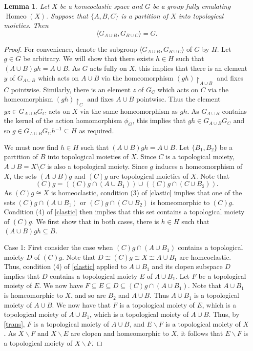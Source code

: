 \documentclass[11pt]{amsart}
\newtheorem{lemma}[theorem]{Lemma}
\theoremstyle{definition}
\newcommand{\Homeo}{\operatorname{Homeo}}
\newcommand{\genset}[1]{\langle #1\rangle}
\begin{document}
\begin{lemma}\label{smallsuppgen}
Let $X$ be a homeoclastic space and $G$ be a group fully emulating $\Homeo(X)$. 
Suppose that \(\{A,B,C\}\) is a partition of \(X\) into topological moieties.
Then 
$$\genset{G_{A\cup B}, G_{B\cup C}}=
G.$$  
\end{lemma}

\begin{proof}
    For convenience, denote the subgroup $\genset{G_{A\cup B}, G_{B\cup C}}$ of $G$ by $H$.
    Let $g\in G$ be arbitrary. 
    We will show that there exists $h\in H$ such that $(A\cup B)gh=A\cup B$. 
    As \(G\) acts fully on \(X\), this implies that there is an element $y$ of \(G_{A\cup B}\) which acts on \(A\cup B\) via the homeomorphism \((gh){\restriction}_{A\cup B}\) and fixes \(C\) pointwise. Similarly, there is an element $z$ of \(G_{C}\) which acts on \(C\) via the homeomorphism \((gh){\restriction}_{C}\) and fixes \(A\cup B\) pointwise.
    Thus the element \(yz\in G_{A\cup B}G_{C}\) acts on \(X\) via the same homeomorphism as \(gh\). As \(G_{A\cup B}\) contains the kernel of the action homomorphism \(\phi_G\), this implies that  $gh\in G_{A\cup B}G_C$ and so \(g\in G_{A\cup B}G_Ch^{-1}\subseteq H\) as required.
    
    We must now find $h\in H$ such that $(A\cup B)gh=A\cup B$.  Let \(\{B_1,B_2\}\) be a partition of \(B\) into topological moieties of $X$. Since $C$ is a topological moiety, $A\cup B=X\setminus C$ is also a topological moiety. Since $g$ induces a homeomorphism of $X$, the sets \((A\cup B)g\) and \((C)g\) are topological moieties of \(X\).  Note that 
    $$(C)g = ((C)g \cap (A\cup B_1)) \cup ((C)g \cap (C\cup B_2)).$$
    As \((C)g\cong X\) is homeoclastic, condition (3) of \cref{clastic} implies that one of the sets \((C)g \cap (A\cup B_1)\) or \((C)g \cap (C\cup B_2)\) is homeomorphic to \((C)g\). Condition (4) of \cref{clastic} then implies that this set contains a topological moiety of \((C)g\).
    We first show that in both cases, there is \(h\in H\) such that \((A\cup B)gh \subseteq B\).
    
    Case 1: First consider the case when \((C)g \cap (A\cup B_1)\) contains a topological moiety \(D\) of \((C)g\). 
    Note that \(D\cong  (C)g \cong X\cong A\cup B_1\) are homeoclastic. Thus, condition (4) of \cref{clastic} applied to $A\cup B_1$ and its clopen subspace $D$ implies that \(D\) contains a topological moiety \(E\) of \(A\cup B_1\). 
    Let \(F\) be a topological moiety of \(E\).
    We now have \(F\subseteq E\subseteq D\subseteq (C)g \cap (A\cup B_1)\). 
    Note that \(A\cup B_1\) is homeomorphic to \(X\), and so are \(B_2\) and \(A\cup B\).
    Thus \(A\cup B_1\) is a topological moiety of \(A\cup B\).
    We now have that \(F\) is a topological moiety of \(E\), which is a topological moiety of \(A\cup B_1\), which is a topological moiety of \(A\cup B\).
    Thus, by \cref{trans}, \(F\) is a topological moiety of \(A\cup B\), and \(E\backslash F\) is a topological moiety of $X$.
    As \(X\backslash F\) and \(X\backslash E\) are clopen and homeomorphic to \(X\), it follows that \(E\backslash F\) is a topological moiety of \(X\backslash F\).
    

\end{proof}
\end{document}
